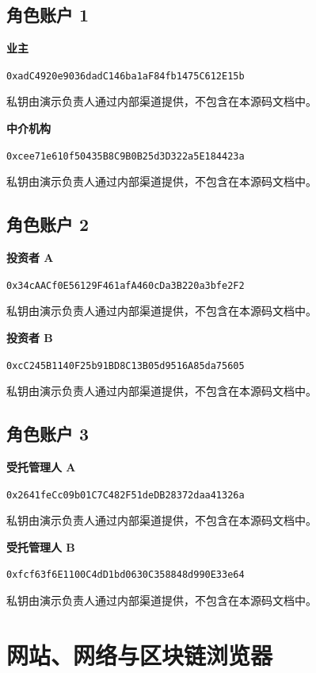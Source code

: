 \documentclass[12pt,a4paper]{article}
\begin{document}
\clearpage\begin{landscape}
\subsection{角色账户 1}
\textbf{业主}\par
\nolinkurl{0xadC4920e9036dadC146ba1aF84fb1475C612E15b}\par
私钥由演示负责人通过内部渠道提供，不包含在本源码文档中。

\textbf{中介机构}\par
\nolinkurl{0xcee71e610f50435B8C9B0B25d3D322a5E184423a}\par
私钥由演示负责人通过内部渠道提供，不包含在本源码文档中。

\end{landscape}
\clearpage\begin{landscape}
\subsection{角色账户 2}
\textbf{投资者 A}\par
\nolinkurl{0x34cAACf0E56129F461afA460cDa3B220a3bfe2F2}\par
私钥由演示负责人通过内部渠道提供，不包含在本源码文档中。

\textbf{投资者 B}\par
\nolinkurl{0xcC245B1140F25b91BD8C13B05d9516A85da75605}\par
私钥由演示负责人通过内部渠道提供，不包含在本源码文档中。

\end{landscape}
\clearpage\begin{landscape}
\subsection{角色账户 3}
\textbf{受托管理人 A}\par
\nolinkurl{0x2641feCc09b01C7C482F51deDB28372daa41326a}\par
私钥由演示负责人通过内部渠道提供，不包含在本源码文档中。

\textbf{受托管理人 B}\par
\nolinkurl{0xfcf63f6E1100C4dD1bd0630C358848d990E33e64}\par
私钥由演示负责人通过内部渠道提供，不包含在本源码文档中。

\end{landscape}
\clearpage\section{网站、网络与区块链浏览器}
\end{document}
